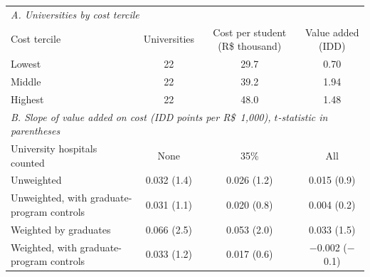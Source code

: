 \begin{tabular}{lccc}
\toprule
\multicolumn{4}{l}{\textit{A. Universities by cost tercile}} \\
Cost tercile & Universities & Cost per student (R\$ thousand) & Value added (IDD) \\
\midrule
Lowest & 22 & 29.7 & 0.70 \\
Middle & 22 & 39.2 & 1.94 \\
Highest & 22 & 48.0 & 1.48 \\
\midrule
\multicolumn{4}{l}{\textit{B. Slope of value added on cost (IDD points per R\$~1{,}000), $t$-statistic in parentheses}} \\
University hospitals counted & None & 35\% & All \\
\midrule
Unweighted & 0.032 (1.4) & 0.026 (1.2) & 0.015 (0.9) \\
Unweighted, with graduate-program controls & 0.031 (1.1) & 0.020 (0.8) & 0.004 (0.2) \\
Weighted by graduates & 0.066 (2.5) & 0.053 (2.0) & 0.033 (1.5) \\
Weighted, with graduate-program controls & 0.033 (1.2) & 0.017 (0.6) & $-$0.002 ($-$0.1) \\
\bottomrule
\end{tabular}